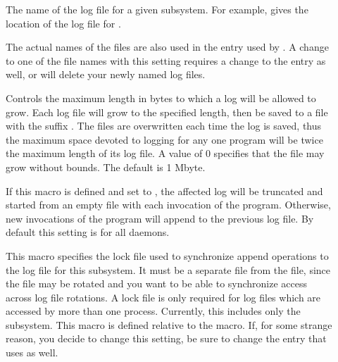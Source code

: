 \begin{description}
  
\item[] \label{param:SubsysLog}
  The name of
  the log file for a given subsystem.  For example,
   gives the location of the log file for
  .

  The actual names of the files
  are also used in the  entry used by
  .  A change to one of the
  file names with this setting requires a change to the
   entry as well, or  will
  delete your newly named log files.

\item[] \label{param:MaxSubsysLog} Controls
  the maximum length in bytes to which a
  log will be allowed to grow.  Each log file will grow to the
  specified length, then be saved to a file with the suffix
  .  The 
  files are overwritten each time the log is saved, thus the maximum
  space devoted to logging for any one program will be twice the
  maximum length of its log file.  A value of 0 specifies that the
  file may grow without bounds.  The default is 1 Mbyte.

\item[]
  \label{param:TruncSubsysLogOnOpen}  If this macro is defined and set
  to , the affected log will be truncated and started from an
  empty file with each invocation of the program.  Otherwise, new
  invocations of the program will append to the previous log
  file.  By default this setting is  for all daemons. 

\item[] \label{param:SubsysLock} 
This macro
  specifies the lock file used to synchronize append operations to the
  log file for this subsystem.  It must be a separate file from the
   file, since the  file may be
  rotated and you want to be able to synchronize access across log
  file rotations.  A lock file is only required for log files which
  are accessed by more than one process.  Currently, this includes
  only the  subsystem.  This macro is defined relative
  to the  macro.  If, for some strange
  reason, you decide to change this setting, be sure to change the
   entry that  uses as well.


\end{description}
